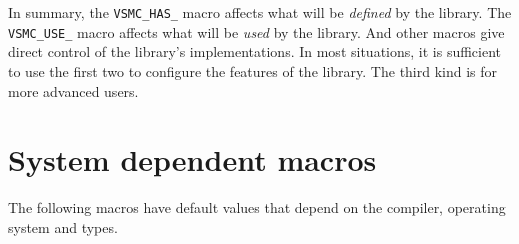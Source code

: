 In summary, the \verb|VSMC_HAS_| macro affects what will be \emph{defined}
by the library. The \verb|VSMC_USE_| macro affects what will be \emph{used}
by the library. And other macros give direct control of the library's
implementations. In most situations, it is sufficient to use the first two to
configure the features of the library. The third kind is for more advanced
users.

\section{System dependent macros}
\label{sec:System dependent macros}

The following macros have default values that depend on the compiler, operating
system and \cpu types.
